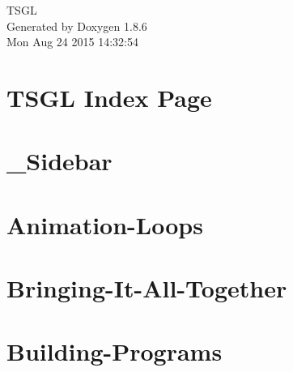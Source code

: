 \documentclass[twoside]{book}
\newcommand{\clearemptydoublepage}{%
  \newpage{\pagestyle{empty}\cleardoublepage}%
}
\begin{document}
\hypersetup{pageanchor=false}
\begin{titlepage}
\vspace*{7cm}
\begin{center}%
{\Large T\-S\-G\-L }\\
\vspace*{1cm}
{\large Generated by Doxygen 1.8.6}\\
\vspace*{0.5cm}
{\small Mon Aug 24 2015 14:32:54}\\
\end{center}
\end{titlepage}
\clearemptydoublepage
\tableofcontents
\clearemptydoublepage
{}
\hypersetup{pageanchor=true}

\chapter{T\-S\-G\-L Index Page}
\label{index}\hypertarget{index}{}
\chapter{\-\_\-\-Sidebar}
\label{md__home_cpd5_workspace__t_s_g_l_docs-wiki___sidebar}
\hypertarget{md__home_cpd5_workspace__t_s_g_l_docs-wiki___sidebar}{}

\chapter{Animation-\/\-Loops}
\label{md__home_cpd5_workspace__t_s_g_l_docs-wiki__animation-_loops}
\hypertarget{md__home_cpd5_workspace__t_s_g_l_docs-wiki__animation-_loops}{}

\chapter{Bringing-\/\-It-\/\-All-\/\-Together}
\label{md__home_cpd5_workspace__t_s_g_l_docs-wiki__bringing-_it-_all-_together}
\hypertarget{md__home_cpd5_workspace__t_s_g_l_docs-wiki__bringing-_it-_all-_together}{}

\chapter{Building-\/\-Programs}
\label{md__home_cpd5_workspace__t_s_g_l_docs-wiki__building-_programs}
\hypertarget{md__home_cpd5_workspace__t_s_g_l_docs-wiki__building-_programs}{}

\end{document}
